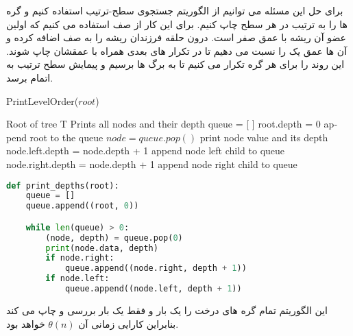 \documentclass[]{article}
\begin{document}
برای حل این مسئله می توانیم از الگوریتم جستجوی سطح-ترتیب استفاده کنیم و گره ها را به ترتیب
در هر سطح چاپ کنیم.
برای این کار از صف استفاده می کنیم که اولین عضو آن ریشه با عمق صفر است.
درون حلقه فرزندان ریشه را به صف اضافه کرده و آن ها عمق یک را نسبت می دهیم تا در تکرار های بعدی
همراه با عمقشان چاپ شوند.
این روند را برای هر گره تکرار می کنیم تا به برگ ها برسیم و پیمایش سطح ترتیب به اتمام برسد.
\begin{latin}
    \begin{algorithm}[H]
        \caption*{PrintLevelOrder($root$)}
        \begin{algorithmic}
            \Require Root of tree T
            \Ensure Prints all nodes and their depth
            \State queue = [ ]
            \State root.depth = 0
            \State append root to the queue
                \State $node = queue.pop()$
                \State print node value and its depth
                \State node.left.depth = node.depth + 1
                \State append node left child to queue
                \EndIf
                \State node.right.depth = node.depth + 1
                \State append node right child to queue
                \EndIf
            \EndWhile
        \end{algorithmic}
    \end{algorithm}
\end{latin}
\begin{latin}
    \begin{lstlisting}[language=Python, caption=Python Implementation]
def print_depths(root):
    queue = []
    queue.append((root, 0))

    while len(queue) > 0:
        (node, depth) = queue.pop(0)
        print(node.data, depth)
        if node.right:
            queue.append((node.right, depth + 1))
        if node.left:
            queue.append((node.left, depth + 1))
    \end{lstlisting}
\end{latin}
این الگوریتم تمام گره های درخت را یک بار و فقط یک بار بررسی و چاپ می کند بنابراین
کارایی زمانی آن $\theta(n)$ خواهد بود.
\end{document}
